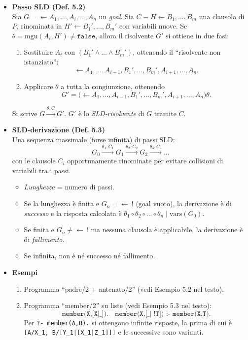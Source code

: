 \documentclass[12pt]{article}
\begin{document}
\begin{itemize}
  \item \textbf{Passo SLD (Def. 5.2)}\\
    Sia $G = \leftarrow A_1,\dots,A_i,\dots,A_n$ un \emph{goal}. Sia $C \equiv H \leftarrow B_1,\dots,B_m$ una clausola di $P$, rinominata in $H' \leftarrow B_1',\dots,B_m'$ con variabili nuove. Se $\theta = \mathrm{mgu}(A_i, H') \neq \texttt{false}$, allora il risolvente $G'$ si ottiene in due fasi:
    \begin{enumerate}
      \item Sostituire $A_i$ con $(B_1'\land \dots \land B_m')$, ottenendo il “risolvente non istanziato”:
      \[
        \leftarrow A_1,\dots,A_{i-1},B_1',\dots,B_m',A_{i+1},\dots,A_n.
      \]
      \item Applicare $\theta$ a tutta la congiunzione, ottenendo
      \[
        G' = \bigl(\leftarrow A_1,\dots,A_{i-1},B_1',\dots,B_m',A_{i+1},\dots,A_n \bigr)\theta.
      \]
    \end{enumerate}
    Si scrive $G \stackrel{\theta, C}{\longrightarrow} G'$. $G'$ è lo \emph{SLD‐risolvente} di $G$ tramite $C$.

  \item \textbf{SLD‐derivazione (Def. 5.3)}\\
    Una sequenza massimale (forse infinita) di passi SLD:
    \[
      G_0 \stackrel{\theta_1, C_1}{\longrightarrow} G_1 \stackrel{\theta_2, C_2}{\longrightarrow} G_2 \stackrel{\theta_3, C_3}{\longrightarrow} \dots
    \]
    con le clausole $C_i$ opportunamente rinominate per evitare collisioni di variabili tra i passi.
    \begin{itemize}
      \item \emph{Lunghezza} = numero di passi.
      \item Se la lunghezza è finita e $G_n = \leftarrow\ !$ (goal vuoto), la derivazione è di \emph{successo} e la risposta calcolata è $\theta_1 \circ \theta_2 \circ \dots \circ \theta_n \mid \mathrm{vars}(G_0)$.
      \item Se finita e $G_n \not\equiv \leftarrow\ !$ ma nessuna clausola è applicabile, la derivazione è di \emph{fallimento}.
      \item Se infinita, non è né successo né fallimento.
    \end{itemize}

  \item \textbf{Esempi}\\
    \begin{enumerate}
      \item Programma “padre/2 + antenato/2” (vedi Esempio 5.2 nel testo).
      \item Programma “member/2” su liste (vedi Esempio 5.3 nel testo):
      \[
        \texttt{member(X,[X|\_]).} \quad
        \texttt{member(X,[\_|\ !T]) :- member(X,T).}
      \]
      Per \texttt{?- member(A,B).} si ottengono infinite risposte, la prima di cui è \texttt{[A/X\_1, B/[Y\_1|[X\_1|Z\_1]]]} e le successive sono varianti.
    \end{enumerate}
\end{itemize}
\end{document}
